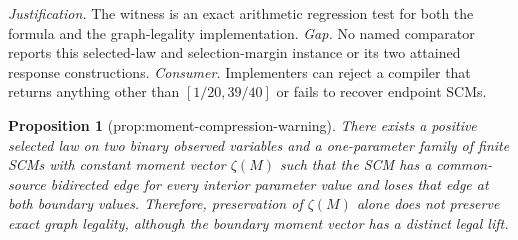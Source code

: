 \documentclass{article}
\newtheorem{proposition}{Proposition}
\begin{document}
\par\smallskip\noindent \textit{Justification.} The witness is an exact arithmetic regression test for both the formula and the graph-legality implementation. \textit{Gap.} No named comparator reports this selected-law and selection-margin instance or its two attained response constructions. \textit{Consumer.} Implementers can reject a compiler that returns anything other than \([1/20,39/40]\) or fails to recover endpoint SCMs.

\begin{proposition}[prop:moment-compression-warning]\label{prop:moment-compression-warning}
There exists a positive selected law on two binary observed variables and a one-parameter family of finite SCMs with constant moment vector \(\zeta(M)\) such that the SCM has a common-source bidirected edge for every interior parameter value and loses that edge at both boundary values. Therefore, preservation of \(\zeta(M)\) alone does not preserve exact graph legality, although the boundary moment vector has a distinct legal lift.
\end{proposition}
\end{document}
